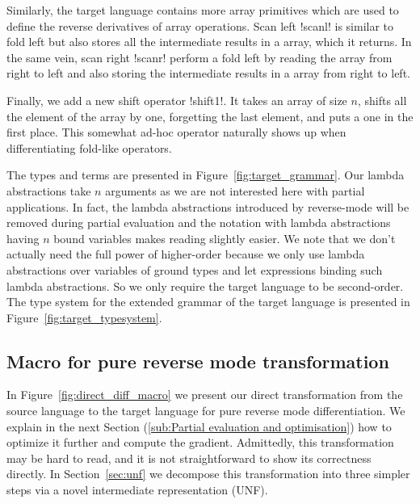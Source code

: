 Similarly, the target language contains more array primitives which are used to define the reverse derivatives of array operations. 
Scan left !scanl! is similar to fold left but also stores all the intermediate results in a array, which it returns.
In the same vein, scan right !scanr! perform a fold left by reading the array from right to left and also storing 
the intermediate results in a array from right to left.

Finally, we add a new shift operator !shift1!. 
It takes an array of size $n$,  shifts all the element of the array by one, 
forgetting the last element, and puts a one in the first place. 
This somewhat ad-hoc operator naturally shows up when differentiating fold-like operators.

The types and terms are presented in Figure~\ref{fig:target_grammar}.
Our lambda abstractions take $n$ arguments as we are not interested here with partial applications. 
In fact, the lambda abstractions introduced by reverse-mode will be removed during partial evaluation 
and the notation with lambda abstractions having $n$ bound variables makes reading slightly easier.
We note that we don't actually need the full power of higher-order because we only use lambda abstractions over variables of ground types
and let expressions binding such lambda abstractions. So we only require the target language to be second-order.
The type system for the extended grammar of the target language is presented in Figure~\ref{fig:target_typesystem}. 





\subsection{Macro for pure reverse mode transformation} %
\label{sub:Macro for pure reverse mode transformation}

In Figure~\ref{fig:direct_diff_macro} we present our direct transformation from the source language to the target language for pure reverse mode differentiation.
We explain in the next Section (\ref{sub:Partial evaluation and optimisation}) how to optimize it further and compute the gradient.
Admittedly, this transformation may be hard to read, and it is not straightforward to show its correctness directly. 
In Section~\ref{sec:unf} we decompose this transformation into three simpler steps via a novel intermediate representation (UNF).

